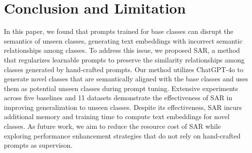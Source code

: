 \section{Conclusion and Limitation}
In this paper, we found that prompts trained for base classes can disrupt the semantics of unseen classes, generating text embeddings with incorrect semantic relationships among classes. To address this issue, we proposed SAR, a method that regularizes learnable prompts to preserve the similarity relationships among classes generated by hand-crafted prompts. Our method utilizes ChatGPT-4o to generate novel classes that are semantically aligned with the base classes and uses them as potential unseen classes during prompt tuning. Extensive experiments across five baselines and 11 datasets demonstrate the effectiveness of SAR in improving generalization to unseen classes. Despite its effectiveness, SAR incurs additional memory and training time to compute text embeddings for novel classes. As future work, we aim to reduce the resource cost of SAR while exploring performance enhancement strategies that do not rely on hand-crafted prompts as supervison.

